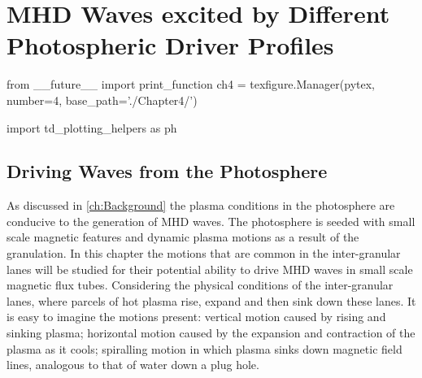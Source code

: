 
\chapter{MHD Waves excited by Different Photospheric Driver Profiles}

\begin{pycode}[chapter4]
from __future__ import print_function
ch4 = texfigure.Manager(pytex, number=4, base_path='./Chapter4/')

import td_plotting_helpers as ph
\end{pycode}


\section{Driving Waves from the Photosphere}\label{sec:5drivers}

As discussed in \cref{ch:Background} the plasma conditions in the photosphere are conducive to the generation of MHD waves.
The photosphere is seeded with small scale magnetic features and dynamic plasma motions as a result of the granulation.
In this chapter the motions that are common in the inter-granular lanes will be studied for their potential ability to drive MHD waves in small scale magnetic flux tubes.
Considering the physical conditions of the inter-granular lanes, where parcels of hot plasma rise, expand and then sink down these lanes.
It is easy to imagine the motions present: vertical motion caused by rising and sinking plasma; horizontal motion caused by the expansion and contraction of the plasma as it cools; spiralling motion in which plasma sinks down magnetic field lines, analogous to that of water down a plug hole.

